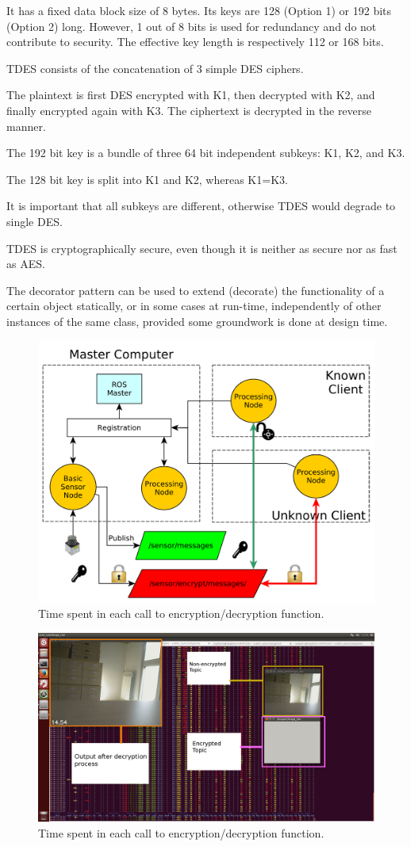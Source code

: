 \documentclass[journal,twoside]{JoPhA}
\begin{document}
It has a fixed data block size of 8 bytes. Its keys are 128 (Option 1) or 192 bits (Option 2) long. However, 1 out of 8 bits is used for redundancy and do not contribute to security. The effective key length is respectively 112 or 168 bits.

TDES consists of the concatenation of 3 simple DES ciphers.

The plaintext is first DES encrypted with K1, then decrypted with K2, and finally encrypted again with K3. The ciphertext is decrypted in the reverse manner.

The 192 bit key is a bundle of three 64 bit independent subkeys: K1, K2, and K3.

The 128 bit key is split into K1 and K2, whereas K1=K3.

It is important that all subkeys are different, otherwise TDES would degrade to single DES.

TDES is cryptographically secure, even though it is neither as secure nor as fast as AES.


The decorator pattern can be used to extend (decorate) the functionality of a certain object statically, or in some cases at run-time, independently of other instances of the same class, provided some groundwork is done at design time. 

\begin{figure}[ht]
    \centering
    \includegraphics[width=.5\textwidth]{TestBed.pdf}
    \caption{Time spent in each call to encryption/decryption function.}
  \label{fig:TestBed}
\end{figure}





\begin{figure}[ht]
    \centering
    \includegraphics[width=.5\textwidth]{Screenshot.png}
    \caption{Time spent in each call to encryption/decryption function.}
  \label{fig:Conceptualmodel}
\end{figure}
\end{document}
